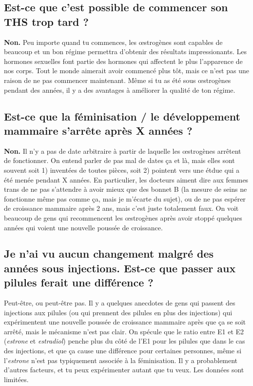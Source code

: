\documentclass{article}
\begin{document}
\subsection{Est-ce que c'est possible de commencer son THS trop tard ?}\label{11-5}

\textbf{Non.} Peu importe quand tu commences, les œstrogènes sont capables de beaucoup et un bon régime permettra d'obtenir des résultats impressionants. Les hormones sexuelles font partie des hormones qui affectent le plus l'apparence de nos corps. Tout le monde aimerait avoir commencé plus tôt, mais ce n'est pas une raison de ne pas commencer maintenant. Même si tu as été sous œstrogènes pendant des années, il y a des avantages à améliorer la qualité de ton régime.

\subsection{Est-ce que la féminisation / le développement mammaire s'arrête après X années ?}\label{11-6}

\textbf{Non.} Il n'y a pas de date arbitraire à partir de laquelle les œstrogènes arrêtent de fonctionner. On entend parler de pas mal de dates ça et là, mais elles sont souvent soit 1) inventées de toutes pièces, soit 2) pointent vers une étdue qui a été menée pendant X années. En particulier, les docteurs aiment dire aux femmes trans de ne pas s'attendre à avoir mieux que des bonnet B (la mesure de seins ne fonctionne même pas comme ça, mais je m'écarte du sujet), ou de ne pas espérer de croissance mammaire après 2 ans, mais c'est juste totalement faux. On voit beaucoup de gens qui recommencent les œstrogènes après avoir stoppé quelques années qui voient une nouvelle poussée de croissance.

\subsection{Je n'ai vu aucun changement malgré des années sous injections. Est-ce que passer aux pilules ferait une différence ?}

Peut-être, ou peut-être pas. Il y a quelques anecdotes de gens qui passent des injections aux pilules (ou qui prennent des pilules en plus des injections) qui expérimentent une nouvelle poussée de croissance mammaire après que ça se soit arrêté, mais le mécanisme n'est pas clair. On spécule que le ratio entre E1 et E2 (\textit{estrone} et \textit{estradiol}) penche plus du côté de l'E1 pour les pilules que dans le cas des injections, et que ça cause une différence pour certaines personnes, même si l'\textit{estrone} n'est pas typiquement associée à la féminisation. Il y a probablement d'autres facteurs, et tu peux expérimenter autant que tu veux. Les données sont limitées.
\end{document}
